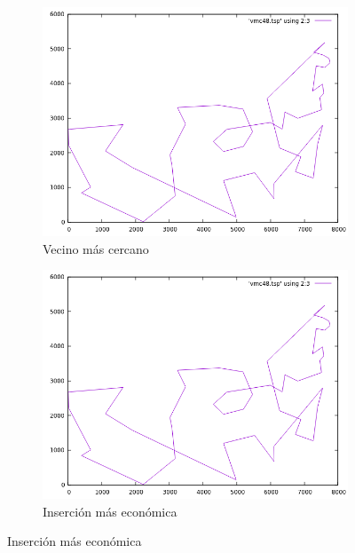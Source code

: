 \documentclass[12pt,spanish]{article}
\begin{document}
\begin{figure}[H]
\centering
\begin{subfigure}[b]{0.36\textwidth}
\includegraphics[width=\textwidth]{att48_vmc.png}
\caption{Vecino más cercano}
\end{subfigure}
\quad
\begin{subfigure}[b]{0.36\textwidth}
\includegraphics[width=\textwidth]{att48_vmc.png}
\caption{Inserción más económica}
\end{subfigure}

\vspace{1cm}


\end{figure}
\end{document}
